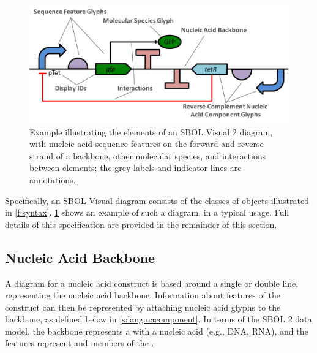 \begin{figure}[h!]
\centering
\includegraphics[width=6in]{figures/SBOLgeneral.pdf}
\caption{Example illustrating the elements of an SBOL Visual 2 diagram, with nucleic acid sequence features on the forward and reverse strand of a backbone, other molecular species, and interactions between elements; the grey labels and indicator lines are annotations.}
\label{f:example}
\end{figure}

Specifically, an SBOL Visual diagram consists of the classes of objects illustrated in \ref{f:syntax}.
\ref{f:example} shows an example of such a diagram, in a typical usage.
Full details of this specification are provided in the remainder of this section.


\subsection{Nucleic Acid Backbone}
\label{s:lang:backbone}

A diagram for a nucleic acid construct is based around a single or double line, representing the nucleic acid backbone. 
Information about features of the construct can then be represented by attaching nucleic acid glyphs to the backbone, as defined below in \ref{s:lang:nacomponent}.
%
In terms of the SBOL 2 data model, the backbone represents a  with a nucleic acid  (e.g., DNA, RNA), and the features represent  and  members of the .

